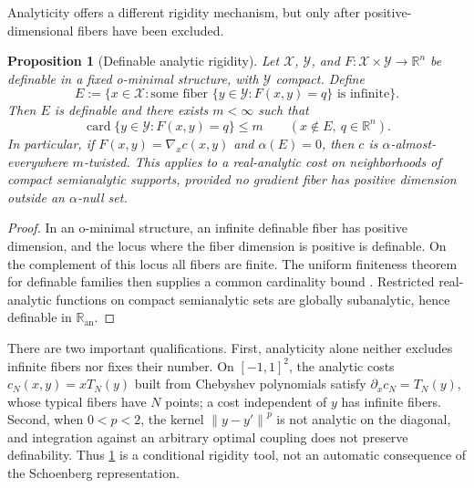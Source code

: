 \documentclass[11pt,a4paper]{article}
\newtheorem{proposition}[theorem]{Proposition}
\theoremstyle{definition}
\theoremstyle{remark}
\newcommand{\R}{\mathbb R}
\newcommand{\card}{\operatorname{card}}
\newcommand{\norm}[1]{\left\lVert #1\right\rVert}
\begin{document}
Analyticity offers a different rigidity mechanism, but only after
positive-dimensional fibers have been excluded.

\begin{proposition}[Definable analytic rigidity]
\label{prop:definable-finite-twist}
Let \(\mathcal X\), \(\mathcal Y\), and
\(F:\mathcal X\times\mathcal Y\to\R^n\) be definable in a fixed o-minimal
structure, with \(\mathcal Y\) compact.  Define
\begin{equation}
  E:=\{x\in\mathcal X:\text{some fiber }
       \{y\in\mathcal Y:F(x,y)=q\}\text{ is infinite}\}.
  \label{eq:infinite-fiber-exceptional-set}
\end{equation}
Then \(E\) is definable and there exists \(m<\infty\) such that
\begin{equation}
  \card\{y\in\mathcal Y:F(x,y)=q\}\leq m
  \qquad(x\notin E,\ q\in\R^n).
  \label{eq:definable-uniform-finiteness}
\end{equation}
In particular, if \(F(x,y)=\nabla_xc(x,y)\) and \(\alpha(E)=0\), then \(c\)
is \(\alpha\)-almost-everywhere \(m\)-twisted.  This applies to a
real-analytic cost on neighborhoods of compact semianalytic supports,
provided no gradient fiber has positive dimension outside an
\(\alpha\)-null set.
\end{proposition}

\begin{proof}
In an o-minimal structure, an infinite definable fiber has positive
dimension, and the locus where the fiber dimension is positive is definable.
On the complement of this locus all fibers are finite.  The uniform
finiteness theorem for definable families then supplies a common cardinality
bound \citep{vandenDries1998}.  Restricted real-analytic functions on compact
semianalytic sets are globally subanalytic, hence definable in
\(\R_{\mathrm{an}}\).
\end{proof}

There are two important qualifications.  First, analyticity alone neither
excludes infinite fibers nor fixes their number.  On \([-1,1]^2\), the
analytic costs
\(
 c_N(x,y)=xT_N(y)
\)
built from Chebyshev polynomials satisfy
\(\partial_xc_N=T_N(y)\), whose typical fibers have \(N\) points; a cost
independent of \(y\) has infinite fibers.  Second, when \(0<p<2\), the kernel
\(\norm{y-y'}^p\) is not analytic on the diagonal, and integration against an
arbitrary optimal coupling does not preserve definability.  Thus
\cref{prop:definable-finite-twist} is a conditional rigidity tool, not an
automatic consequence of the Schoenberg representation.
\end{document}
